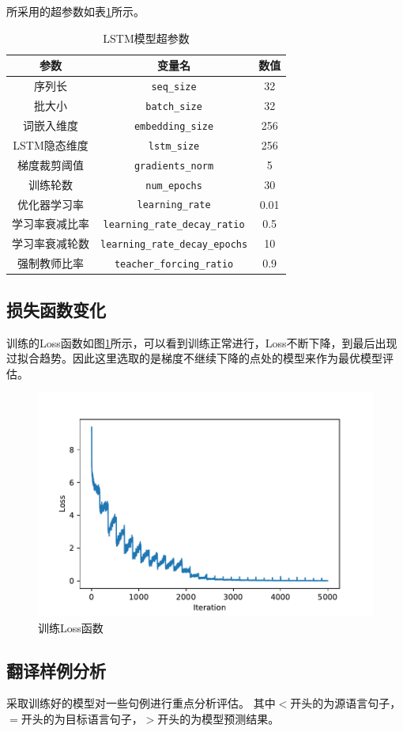 \documentclass[logo,reportComp]{thesis}
\begin{document}
所采用的超参数如表\ref{tab:lstm_hyperparam}所示。
\begin{table}[H]
\caption{LSTM模型超参数}
\label{tab:lstm_hyperparam}
\centering
\begin{tabular}{|c|c|c|}\hline
参数 & 变量名 & 数值\\\hline
序列长 & \verb'seq_size' & 32\\\hline
批大小 & \verb'batch_size' & 32\\\hline
词嵌入维度 & \verb'embedding_size' & 256\\\hline
LSTM隐态维度\cite{bib:pytorch_lstm} & \verb'lstm_size' & 256\\\hline
梯度裁剪阈值\cite{bib:gradient_clipping} & \verb'gradients_norm' & 5\\\hline
训练轮数 & \verb'num_epochs' & 30\\\hline
优化器学习率 & \verb'learning_rate' & 0.01\\\hline
学习率衰减比率 & \verb'learning_rate_decay_ratio' & 0.5\\\hline
学习率衰减轮数 & \verb'learning_rate_decay_epochs' & 10\\\hline
强制教师比率 & \verb'teacher_forcing_ratio' & 0.9\\\hline
\end{tabular}
\end{table}

\subsection{损失函数变化}
训练的Loss函数如图\ref{fig:train_loss}所示，可以看到训练正常进行，Loss不断下降，到最后出现过拟合趋势。因此这里选取的是梯度不继续下降的点处的模型来作为最优模型评估。
\begin{figure}[H]
\centering
\includegraphics[width=0.6\linewidth]{fig/train_loss.pdf}
\caption{训练Loss函数}
\label{fig:train_loss}
\end{figure}

\subsection{翻译样例分析}
采取训练好的模型对一些句例进行重点分析评估。
其中$<$开头的为源语言句子，$=$开头的为目标语言句子，$>$开头的为模型预测结果。
\end{document}
